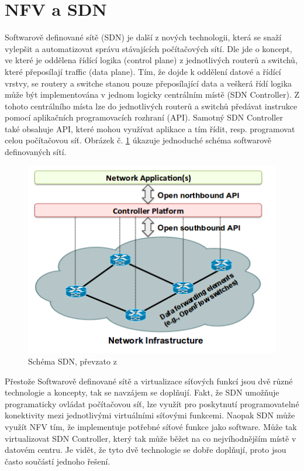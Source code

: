 \section{NFV a SDN} \label{sub:SDN}

Softwarově definované sítě (SDN) je další z nových technologii, která se snaží vylepšit a automatizovat správu stávajících počítačových sítí. Dle \cite{SDN_clanek} jde o koncept, ve které je oddělena řídící logika (control plane) z jednotlivých routerů a switchů, které přeposílají traffic (data plane). Tím, že dojde k oddělení datové a řídící vrstvy, se routery a switche stanou pouze přeposílající data a veškerá řídí logika může být implementována v jednom logicky centrálním místě (SDN Controller). Z tohoto centrálního místa lze do jednotlivých routerů a switchů předávat instrukce pomocí aplikačních programovacích rozhraní (API). Samotný SDN Controller také obsahuje API, které mohou využívat aplikace a tím řídit, resp. programovat celou počítačovou síť. Obrázek č. \ref{fig:SDN} úkazuje jednoduché schéma softwarově definovaných sítí.

\begin{figure}[h]
\begin{centering}
\includegraphics[scale=0.60]{images/SDN}
\par\end{centering}
\caption{Schéma SDN, převzato z \cite{SDN_clanek}\label{fig:SDN}}
\end{figure}

Přestože Softwarově definované sítě a virtualizace síťových funkcí jsou dvě různé technologie a koncepty, tak se navzájem se doplňují. Fakt, že SDN umožňuje programaticky ovládat počítačovou síť, lze využít pro poskytnutí programovatelné konektivity mezi jednotlivými virtuálními síťovými funkcemi. Naopak SDN může využít NFV tím, že implementuje potřebné síťové funkce jako software. Může tak virtualizovat SDN Controller, který tak může běžet na co nejvíhodnějším místě v datovém centru. Je vidět, že tyto dvě technologie se dobře doplňují, proto jsou často součástí jednoho řešení. \cite{SDN_book}

